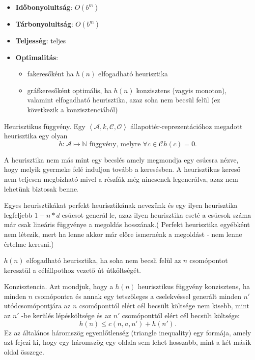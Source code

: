 \begin{itemize}
    \item {\bf Időbonyolultság}: $O(b^m)$
    \item {\bf Tárbonyolultság}: $O(b^m)$
    \item {\bf Teljesség}: teljes
    \item {\bf Optimalitás}:
        \begin{itemize}
            \item fakeresőként ha $h(n)$ elfogadható heurisztika
            \item gráfkeresőként optimális, ha $h(n)$ konzisztens (vagyis
                monoton), valamint elfogadható heurisztika, azaz soha nem
                becsül felül (ez következik a konzisztenciából)
        \end{itemize}
\end{itemize}

\begin{definicio}
    Heurisztikus függvény.
    Egy $\left<\mathcal{A}, k, \mathcal{C}, \mathcal{O} \right>$
    állapottér-reprezentációhoz megadott heurisztika egy olyan \[
        h : \mathcal{A} \mapsto \mathbb{N} \text{ függvény, melyre }
        \forall c \in \mathcal{C} h(c) = 0
    .\]

    A heurisztika nem más mint egy becslés amely megmondja egy csúcsra nézve,
    hogy melyik gyermeke felé induljon tovább a keresésben. A heurisztikus
    kereső nem teljesen megbízható mivel a részfák még nincsenek legenerálva,
    azaz nem lehetünk biztosak benne.

    Egyes heurisztikákat perfekt heurisztikának nevezünk és egy ilyen
    heurisztika legfeljebb $1+n*d$ csúcsot generál le, azaz ilyen heurisztika
    eseté a csúcsok száma már csak lineáris függvénye a megoldás hosszának.(
    Perfekt heurisztika egyébként nem létezik, mert ha lenne akkor már előre
    ismernénk a megoldást - nem lenne értelme keresni.)
\end{definicio}

\begin{tetel}
    $h(n)$ elfogadható heurisztika, ha soha nem becsli felül az $n$ csomópontot
    keresztül a célállpothoz vezető út útköltségét.
\end{tetel}

\begin{definicio}
    Konzisztencia.
    Azt mondjuk, hogy a $h(n)$ heurisztikus függvény konzisztens, ha minden $n$
    csomópontra és annak egy tetszőleges a cselekvéssel generált minden $n'$
    utódcsomópontjára az $n$ csomóponttól elért cél becsült költsége nem kisebb, mint
    az $n'$ -be kerülés lépésköltsége és az $n'$ csomóponttól elért cél becsült
    költsége: \[
        h(n) \le c (n, a, n') + h(n')
    .\]
    Ez az általános háromszög egyenlőtlenség (triangle inequality) egy formája,
    amely azt fejezi ki, hogy egy háromszög egy oldala sem lehet hosszabb, mint
    a két másik oldal összege.
\end{definicio}
